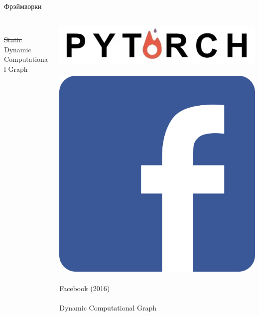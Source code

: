 \documentclass[notes,12pt, aspectratio=169]{beamer}
\begin{document}
\begin{frame}{Фрэймворки}
\begin{columns}[T]
\begin{column}{.33\textwidth}
		\mbox{ } \\
		\sout{Static}  Dynamic Computational Graph
	\end{column}%
	\hfill%
	\begin{column}{.33\textwidth}
		\centering 	\includegraphics[width=.7\linewidth]{pytorch.png} \\
		\mbox{ } \\
		\centering 	\includegraphics[width=.3\linewidth]{facebook.png} \\
		\mbox{ } \\
		Facebook (2016) \\
		\mbox{ } \\
		Dynamic Computational Graph
	\end{column}%
\end{columns}
\end{frame}
\end{document}

